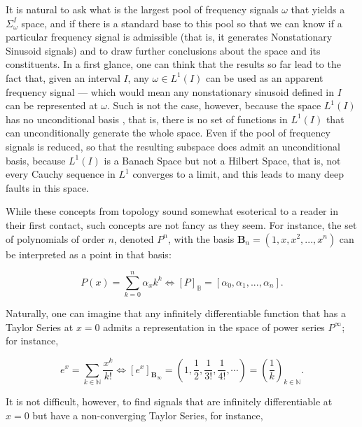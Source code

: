 	It is natural to ask what is the largest pool of frequency signals $\omega$ that yields a $\Sigma^I_\omega$ space, and if there is a standard base to this pool so that we can know if a particular frequency signal is admissible (that is, it generates Nonstationary Sinusoid signals) and to draw further conclusions about the space and its constituents. In a first glance, one can think that the results so far lead to the fact that, given an interval $I$, any $\omega\in L^1\left(I\right)$ can be used as an apparent frequency signal — which would mean any nonstationary sinusoid defined in $I$ can be represented at $\omega$. Such is not the case, however, because the space $L^1\left(I\right)$ has no unconditional basis , that is, there is no set of functions in $L^1\left(I\right)$ that can unconditionally generate the whole space. Even if the pool of frequency signals is reduced, so that the resulting subspace does admit an unconditional basis, because $L^1\left(I\right)$ is a Banach Space but not a Hilbert Space, that is, not every Cauchy sequence in $L^1$ converges to a limit, and this leads to many deep faults in this space.

	While these concepts from topology sound somewhat esoterical to a reader in their first contact, such concepts are not fancy as they seem. For instance, the set of polynomials of order $n$, denoted $P^n$, with the basis $\mathbf{B}_n = \left(1,x,x^2,...,x^n\right)$ can be interpreted as a point in that basis:

\begin{equation} P(x) = \sum_{k=0}^n \alpha_x k^k \Leftrightarrow \left[P\right]_{\mathbb{B}} = \left[\alpha_0,\alpha_1,...,\alpha_n\right] .\end{equation}

	Naturally, one can imagine that any infinitely differentiable function that has a Taylor Series at $x=0$ admits a representation in the space of power series $P^\infty$; for instance,

\begin{equation} e^x = \sum_{k\in\mathbb{N}} \dfrac{x^k}{k!} \Leftrightarrow \left[e^x\right]_{\mathbf{B}_\infty} = \left(1,\dfrac{1}{2},\dfrac{1}{3!},\dfrac{1}{4!},\cdots\right) = \left(\dfrac{1}{k}\right)_{k\in\mathbb{N}} .\end{equation}

	It is not difficult, however, to find signals that are infinitely differentiable at $x=0$ but have a non-converging Taylor Series, for instance,


